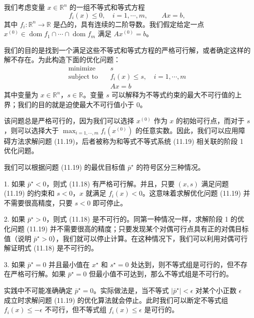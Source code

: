 \documentclass[UTF8,12pt,a4paper,fontset=fandol]{ctexart}
\begin{document}
我们考虑变量 $x\in\mathbb{R}^n$ 的一组不等式和等式方程
\begin{equation}
f_i(x)\leq 0,\quad i=1,\cdots,m,\qquad Ax=b,
\tag{11.18}
\end{equation}
其中 $f_i:\mathbb{R}^n\to\mathbb{R}$ 是凸的，具有连续的二阶导数。我们假定给定一点 $x^{(0)}\in\operatorname{dom} f_1\cap\cdots\cap\operatorname{dom} f_m$ 满足 $Ax^{(0)}=b$。

我们的目的是找到一个满足这些不等式和等式方程的严格可行解，或者确定这样的解不存在。为此构造下面的优化问题：
\begin{equation}
\begin{aligned}
\text{minimize}\quad & s\\
\text{subject to}\quad & f_i(x)\leq s,\quad i=1,\cdots,m\\
& Ax=b
\end{aligned}
\tag{11.19}
\end{equation}
其中变量为 $x\in\mathbb{R}^n$，$s\in\mathbb{R}$。变量 $s$ 可以解释为不等式约束的最大不可行值的上界；我们的目的就是迫使最大不可行值小于 0。

该问题总是严格可行的，因为我们可以选择 $x^{(0)}$ 作为 $x$ 的初始可行点，而对于 $s$，则可以选择大于 $\max_{i=1,\cdots,m}f_i(x^{(0)})$ 的任意实数。因此，我们可以应用障碍方法求解问题 (11.19)，后者被称为和等式不等式系统 (11.19) 相关联的阶段 1 优化问题。

我们可以根据问题 (11.19) 的最优目标值 $\bar{p}^\star$ 的符号区分三种情况。

1. 如果 $\bar{p}^\star<0$，则式 (11.18) 有严格可行解。并且，只要 $(x,s)$ 满足问题 (11.19) 的约束和 $s<0$，$x$ 就满足 $f_i(x)<0$。这意味着求解优化问题 (11.19) 并不需要很高精度，只要 $s<0$ 即可停止。

2. 如果 $\bar{p}^\star>0$，则式 (11.18) 是不可行的。同第一种情况一样，求解阶段 1 的优化问题 (11.19) 并不需要很高的精度；只要发现某个对偶可行点具有正的对偶目标值（说明 $\bar{p}^\star>0$），我们就可以停止计算。在这种情况下，我们可以利用对偶可行解证明式 (11.18) 是不可行的。

3. 如果 $\bar{p}^\star=0$ 并且最小值在 $x^\star$ 和 $s^\star=0$ 处达到，则不等式组是可行的，但不存在严格可行解。如果 $\bar{p}^\star=0$ 但最小值不可达到，那么不等式组是不可行的。

实践中不可能准确确定 $\bar{p}^\star=0$。实际做法是，当不等式 $|\bar{p}^\star|<\epsilon$ 对某个小正数 $\epsilon$ 成立时求解问题 (11.19) 的优化算法就会停止。此时我们可以断定不等式组 $f_i(x)\leq -\epsilon$ 不可行，但不等式组 $f_i(x)\leq \epsilon$ 是可行的。
\end{document}

